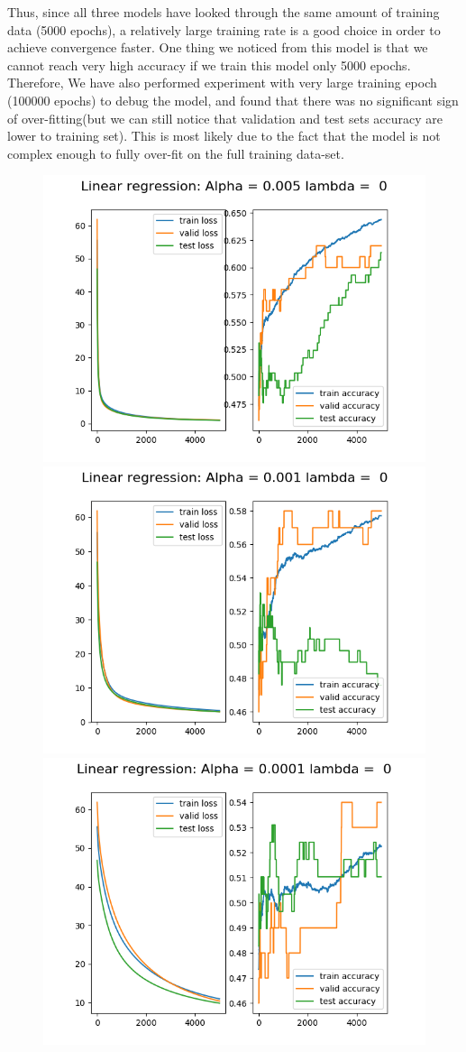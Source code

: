 \documentclass[10pt,letterpaper]{article}
\begin{document}
Thus, since all three models have looked through the same amount of training data (5000 epochs), a relatively large training rate is a good choice in order to achieve convergence faster. One thing we noticed from this model is that we cannot reach very high accuracy if we train this model only 5000 epochs. Therefore, We have also performed experiment with very large training epoch (100000 epochs) to debug the model, and found that there was no significant sign of over-fitting(but we can still notice that validation and test sets accuracy are lower to training set). This is most likely due to the fact that the model is not complex enough to fully over-fit on the full training data-set.\\





\begin{figure}[H]
\centering
  \begin{subfig}
  \includegraphics[width=.5\linewidth]{Linear_regression_005.png}\hfill
  \includegraphics[width=.5\linewidth]{Linear_regression_001.png}\hfill
  \includegraphics[width=.5\linewidth]{Linear_regression_0001.png}\hfill

\end{subfig}
\end{figure}
\end{document}
